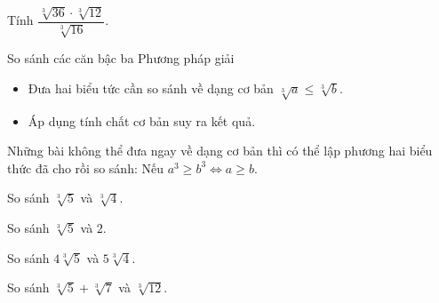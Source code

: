 \begin{vd}
	Tính $ \dfrac{\sqrt[3]{36} \cdot \sqrt[3]{12}}{\sqrt[3]{16}} $.
\end{vd}

\begin{dang}{So sánh các căn bậc ba}
    Phương pháp giải
    \begin{itemize}
    	\item Đưa hai biểu tức cần so sánh về dạng cơ bản $ \sqrt[3]{a} \leqslant \sqrt[3]{b} $.
    	\item Áp dụng tính chất cơ bản suy ra kết quả.
    \end{itemize}
    \begin{note}
        Những bài không thể đưa ngay về dạng cơ bản thì có thể lập phương hai biểu thức đã cho rồi so sánh: Nếu $ a^3 \geqslant b^3 \Leftrightarrow a \geqslant b $.
    \end{note}
\end{dang}

\begin{vd}
    So sánh $ \sqrt[3]{5} $ và $ \sqrt[3]{4} $.
\end{vd}

\begin{vd}
    So sánh $ \sqrt[3]{5} $ và $ 2 $.
\end{vd}

\begin{vd}
    So sánh $ 4\sqrt[3]{5} $ và $ 5\sqrt[3]{4} $.
\end{vd}

\begin{vd}
    So sánh $ \sqrt[3]{5} + \sqrt[3]{7} $ và $ \sqrt[3]{12} $.
\end{vd}

